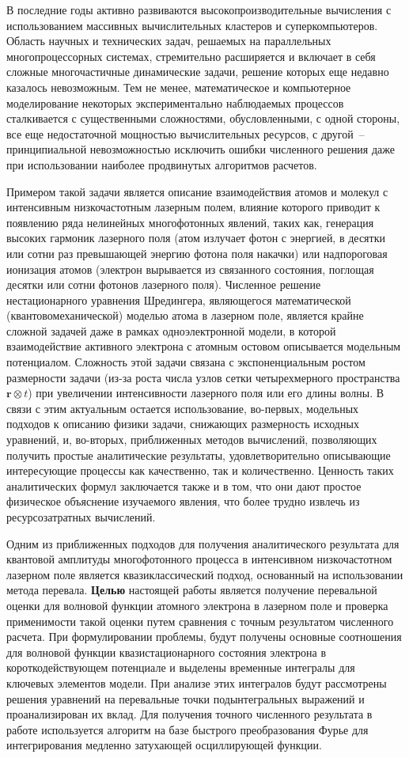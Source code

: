 \documentclass[14pt]{extarticle}
\newcommand{\vr}{\mathbf{r}}
\begin{document}
В последние годы активно развиваются высокопроизводительные вычисления с использованием массивных вычислительных кластеров и суперкомпьютеров. Область научных и технических задач, решаемых на параллельных многопроцессорных системах, стремительно расширяется и включает в себя сложные многочастичные динамические задачи, решение которых еще недавно казалось невозможным. Тем не менее, математическое и компьютерное моделирование некоторых экспериментально наблюдаемых процессов сталкивается с существенными сложностями, обусловленными, с одной стороны, все еще недостаточной мощностью вычислительных ресурсов, с другой~-- принципиальной невозможностью исключить ошибки численного решения даже при использовании наиболее продвинутых алгоритмов расчетов.  

Примером такой задачи является описание взаимодействия атомов и молекул с интенсивным низкочастотным лазерным полем, влияние которого приводит к появлению ряда нелинейных многофотонных явлений, таких как, генерация высоких гармоник лазерного поля (атом излучает фотон с энергией, в десятки или сотни раз превышающей энергию фотона поля накачки) или надпороговая ионизация атомов (электрон вырывается из связанного состояния, поглощая десятки или сотни фотонов лазерного поля). Численное решение нестационарного уравнения Шредингера, являющегося математической (квантовомеханической) моделью атома в лазерном поле, является крайне сложной задачей даже в рамках одноэлектронной модели, в которой взаимодействие активного электрона с атомным остовом описывается модельным потенциалом. Сложность этой задачи связана с экспоненциальным ростом размерности задачи (из-за роста числа узлов сетки четырехмерного пространства $\vr\otimes t$) при увеличении интенсивности лазерного поля или его длины волны. В связи с этим актуальным остается использование, во-первых, модельных подходов к описанию физики задачи, снижающих размерность исходных уравнений, и, во-вторых, приближенных методов вычислений, позволяющих получить простые аналитические результаты, удовлетворительно описывающие интересующие процессы как качественно, так и количественно. Ценность таких аналитических формул заключается также и в том, что они дают простое физическое объяснение изучаемого явления, что более трудно извлечь из ресурсозатратных вычислений.

Одним из приближенных подходов для получения аналитического результата для квантовой амплитуды многофотонного процесса в интенсивном низкочастотном лазерном поле является квазиклассический подход, основанный на использовании метода перевала. \textbf{Целью} настоящей работы является получение перевальной оценки для волновой функции атомного электрона в лазерном поле и проверка применимости такой оценки путем сравнения с точным результатом численного расчета. При формулировании проблемы, будут получены основные соотношения для волновой функции квазистационарного состояния электрона в короткодействующем потенциале и выделены временные интегралы для ключевых элементов модели. При анализе этих интегралов будут рассмотрены решения уравнений на перевальные точки подынтегральных выражений и проанализирован их вклад. Для получения точного численного результата в работе используется алгоритм на базе быстрого преобразования Фурье для интегрирования медленно затухающей осциллирующей функции.
\end{document}
